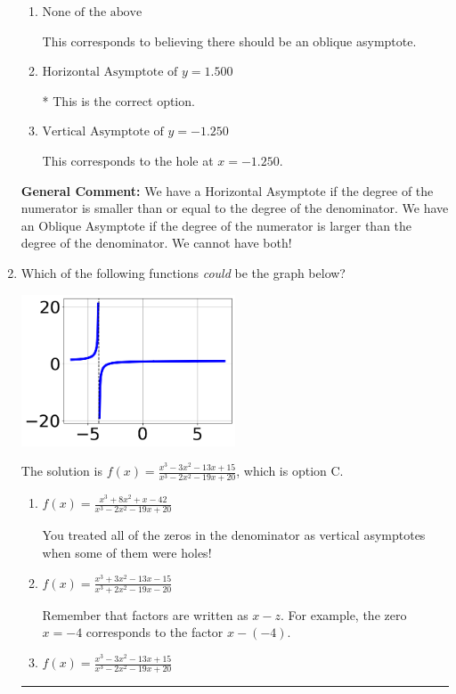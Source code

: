 \documentclass{extbook}[14pt]
\newcommand{\litem}[1]{\item #1

\rule{\textwidth}{0.4pt}}
\begin{document}
\begin{enumerate}
{\begin{enumerate}[label=\Alph*.]
This corresponds to using the rule for Horizontal Asymptote when the degree of the denominator is larger than the numerator.
\item \( \text{None of the above} \)

This corresponds to believing there should be an oblique asymptote.
\item \( \text{Horizontal Asymptote of } y = 1.500  \)

* This is the correct option.
\item \( \text{Vertical Asymptote of } y = -1.250  \)

This corresponds to the hole at $x = -1.250$.
\end{enumerate}

\textbf{General Comment:} We have a Horizontal Asymptote if the degree of the numerator is smaller than or equal to the degree of the denominator. We have an Oblique Asymptote if the degree of the numerator is larger than the degree of the denominator. We cannot have both!
}
\litem{
Which of the following functions \textit{could} be the graph below?

\begin{center}
    \includegraphics[width=0.5\textwidth]{../Figures/identifyGraphOfRationalFunctionA.png}
\end{center}




The solution is \( f(x)=\frac{x^{3} -3 x^{2} -13 x + 15}{x^{3} -2 x^{2} -19 x + 20} \), which is option C.\begin{enumerate}[label=\Alph*.]
\item \( f(x)=\frac{x^{3} +8 x^{2} +x -42}{x^{3} -2 x^{2} -19 x + 20} \)

You treated all of the zeros in the denominator as vertical asymptotes when some of them were holes!
\item \( f(x)=\frac{x^{3} +3 x^{2} -13 x -15}{x^{3} +2 x^{2} -19 x -20} \)

Remember that factors are written as $x-z$. For example, the zero $x=-4$ corresponds to the factor $x-(-4)$.
\item \( f(x)=\frac{x^{3} -3 x^{2} -13 x + 15}{x^{3} -2 x^{2} -19 x + 20} \)


\end{enumerate}}
\end{enumerate}
\end{document}
